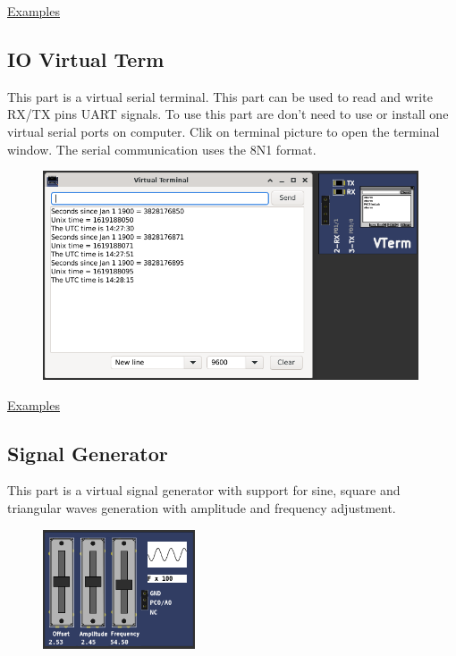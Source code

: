 \href{https://lcgamboa.github.io/picsimlab_examples/parts_D._Transfer_Function.html}{Examples}

\subsection{IO Virtual Term} \hypertarget{def:vterm}{}

This part is a virtual serial terminal. This part can be used to read and write RX/TX pins UART signals.
To use this part are don't need to use or install one virtual serial ports on computer.  
Clik on terminal picture to open the terminal window.
The serial communication uses the 8N1 format.

\begin{figure}[H]
\center
\includegraphics[width=0.99\textwidth]{img/part_vterm.png} 
\end{figure} 

\href{https://lcgamboa.github.io/picsimlab_examples/parts_IO_Virtual_Term.html}{Examples}

\subsection{Signal Generator}

This part is a virtual signal generator with support for sine, square and triangular waves 
generation with amplitude and frequency adjustment.

\begin{figure}[H]
\center
\includegraphics[width=0.4\textwidth]{img/part_sgen.png} 
\end{figure}

